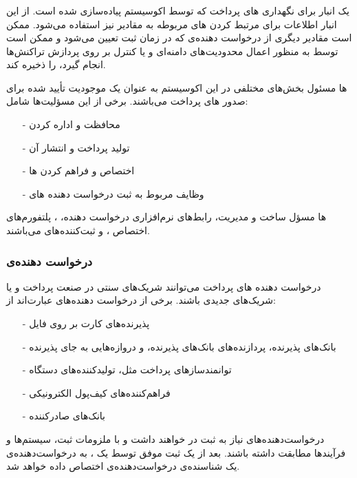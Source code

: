 \documentclass[oneside]{report}
\begin{document}
 \subsubsection{{\small {}}}
			یک انبار برای نگهداری 
			{\normalsize {}}های
			پرداخت که توسط اکوسیستم 
			{\normalsize {}}
			پیاده‌سازی شده است. از این انبار اطلاعات برای مرتبط کردن 
			{\normalsize {}}‌های 
			مربوطه به مقادیر 
			{\normalsize {}}
			نیز استفاده می‌شود. 
			{\normalsize {}}
			ممکن است مقادیر دیگری از درخواست دهنده‌ی 
			{\normalsize {}}
			که در زمان ثبت تعیین می‌شود و ممکن است توسط 
			{\normalsize {}}
			به منظور اعمال محدودیت‌های دامنه‌ای و یا کنترل بر روی پردازش تراکنش‌ها انجام گیرد، را ذخیره کند.
					
	{\normalsize {}}ها 
	مسئول بخش‌‌های مختلفی در این اکوسیستم به عنوان  یک موجودیت تأیید شده برای صدور 
	{\normalsize {}}های 
	پرداخت می‌باشند. برخی از این مسؤلیت‌ها شامل‌:
	\begin{itemize}
		\item[-]محافظت و اداره کردن 
				{\normalsize {}}	
		\item[-]تولید 
					{\normalsize {}}
					پرداخت و انتشار آن
		\item[-] اختصاص و فراهم کردن 
					{\normalsize {}}ها
		\item[-]وظایف مربوط به ثبت درخواست دهنده ‌های 
					{\normalsize {}}
	\end{itemize}
								{\normalsize {}}ها 
								مسؤل ساخت و مدیریت، رابط‌های نرم‌افزاری درخواست دهنده، 
											{\normalsize {}}،
								 پلتفورم‌های اختصاص 
														{\normalsize {}}،
														 و ثبت‌کننده‌های 
																	{\normalsize {}}
																	می‌باشند. 

\subsubsection{درخواست دهنده‌ی     {\small {}}}
درخواست دهنده ‌های 
{\normalsize {}}
پرداخت می‌توانند شریک‌های سنتی در صنعت پرداخت و یا شریک‌های جدیدی باشند. برخی از درخواست دهنده‌های 
{\normalsize {}}
عبارت‌اند از: 
\begin{itemize}
	\item[-] پذیرنده‌های کارت بر روی فایل
	\item[-]بانک‌های پذیرنده،  پردازنده‌های بانک‌های پذیرنده،  و دروازه‌هایی به جای پذیرنده
	\item[-]توانمندسازهای پرداخت مثل، 
	تولیدکننده‌های دستگاه
	{\normalsize {}}
	\item[-]فراهم‌کننده‌های کیف‌پول الکترونیکی
	\item[-] بانک‌های صادرکننده 
\end{itemize}
درخواست‌دهنده‌های 
{\normalsize {}}
نیاز به ثبت در 
{\normalsize {}}
خواهند داشت و با ملزومات ثبت،  سیستم‌ها و فرآیندها مطابقت داشته باشند. بعد از یک ثبت موفق توسط یک 
{\normalsize {}}
، به درخواست‌دهنده‌ی 
{\normalsize {}}
یک شناسنده‌ی درخواست‌دهنده‌ی 
{\normalsize {}}
اختصاص داده خواهد شد. 
\end{document}
